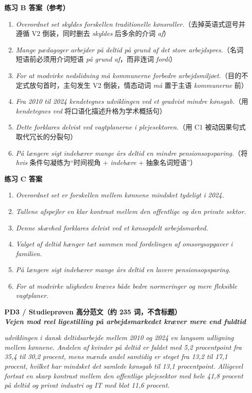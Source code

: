 \begin{answerbox}
\textbf{练习 B 答案（参考）}
\begin{enumerate}
  \item \textit{Overordnet set skyldes forskellen traditionelle kønsroller.}（去掉英语式逗号并遵循 V2 倒装，同时删去 \textit{skyldes} 后多余的介词 \textit{af}）
  \item \textit{Mange pædagoger arbejder på deltid på grund af det store arbejdspres.}（名词短语前必须用介词短语 \textit{på grund af}，而非连词 \textit{fordi}）
  \item \textit{For at modvirke nedslidning må kommunerne forbedre arbejdsmiljøet.}（目的不定式放句首时，主句发生 V2 倒装，情态动词 \textit{må} 置于主语 \textit{kommunerne} 前）
  \item \textit{Fra 2010 til 2024 kendetegnes udviklingen ved et gradvist mindre kønsgab.}（用 \textit{kendetegnes ved} 将口语化描述升格为学术概括句）
  \item \textit{Dette forklares delvist ved vagtplanerne i plejesektoren.}（用 C1 被动因果句式取代冗长的分裂句）
  \item \textit{På længere sigt indebærer mange års deltid en mindre pensionsopsparing.}（将 \textit{hvis} 条件句凝练为“时间视角 + \textit{indebære} + 抽象名词短语”）
\end{enumerate}

\textbf{练习 C 答案}
\begin{enumerate}
  \item \textit{Overordnet set er forskellen mellem kønnene mindsket tydeligt i 2024.}
  \item \textit{Tallene afspejler en klar kontrast mellem den offentlige og den private sektor.}
  \item \textit{Denne skævhed forklares delvist ved et kønsopdelt arbejdsmarked.}
  \item \textit{Valget af deltid hænger tæt sammen med fordelingen af omsorgsopgaver i familien.}
  \item \textit{På længere sigt indebærer mange års deltid en lavere pensionsopsparing.}
  \item \textit{For at modvirke uligheden kræves både bedre normeringer og mere fleksible vagtplaner.}
\end{enumerate}

\textbf{PD3 / Studieprøven 高分范文（约 235 词，不含标题）}\\
\textit{\textbf{Vejen mod reel ligestilling på arbejdsmarkedet kræver mere end fuldtid}}

\textit{ udviklingen i dansk deltidsarbejde mellem 2010 og 2024  en langsom udligning mellem kønnene. Andelen af kvinder på deltid er faldet med 5,2 procentpoint fra 35,4 til 30,2 procent, mens mænds andel samtidig er steget fra 13,2 til 17,1 procent, hvilket har mindsket det samlede kønsgab til 13,1 procentpoint. Alligevel  fortsat en skarp kontrast mellem den offentlige plejesektor med hele 41,8 procent på deltid og privat industri og IT med blot 11,6 procent.}


\end{answerbox}
